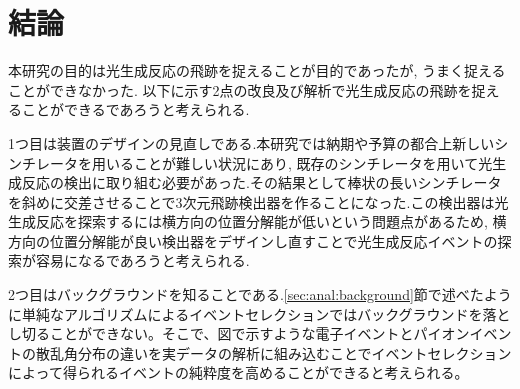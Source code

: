 \chapter{結論}\label{cha:conclusion}
本研究の目的は光生成反応の飛跡を捉えることが目的であったが, うまく捉えることができなかった.
以下に示す2点の改良及び解析で光生成反応の飛跡を捉えることができるであろうと考えられる.

1つ目は装置のデザインの見直しである.本研究では納期や予算の都合上新しいシンチレータを用いることが難しい状況にあり, 既存のシンチレータを用いて光生成反応の検出に取り組む必要があった.その結果として棒状の長いシンチレータを斜めに交差させることで3次元飛跡検出器を作ることになった.この検出器は光生成反応を探索するには横方向の位置分解能が低いという問題点があるため, 横方向の位置分解能が良い検出器をデザインし直すことで光生成反応イベントの探索が容易になるであろうと考えられる.

2つ目はバックグラウンドを知ることである.\ref{sec:anal:background}節で述べたように単純なアルゴリズムによるイベントセレクションではバックグラウンドを落とし切ることができない。そこで、図で示すような電子イベントとパイオンイベントの散乱角分布の違いを実データの解析に組み込むことでイベントセレクションによって得られるイベントの純粋度を高めることができると考えられる。